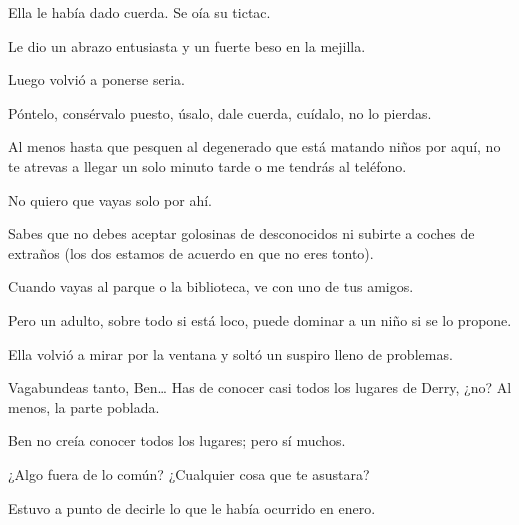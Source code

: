\sk
Ella le había dado cuerda. Se oía su tictac.

\sk
Le dio un abrazo entusiasta y un fuerte beso en la mejilla.

\sk
Luego volvió a ponerse seria.

\sk
Póntelo, consérvalo puesto, úsalo, dale
cuerda, cuídalo, no lo pierdas.

\sk
Al menos hasta que pesquen al degenerado que está
matando niños por aquí, no te atrevas a llegar un
solo minuto tarde o me tendrás al teléfono.

\sk
No quiero que vayas solo por ahí.

\sk
Sabes que no debes aceptar golosinas de
desconocidos ni subirte a coches de extraños (los
dos estamos de acuerdo en que no eres tonto).

\sk
Cuando vayas al parque o la biblioteca,
ve con uno de tus amigos.

\sk
Pero un adulto, sobre
todo si está loco, puede dominar a un niño si se lo
propone. 

\sk
Ella volvió a mirar por la ventana y soltó un
suspiro lleno de problemas.

\sk
Vagabundeas tanto, Ben\ldots{} Has de conocer casi
todos los lugares de Derry, ¿no? Al menos, la parte
poblada.

\sk
Ben no creía conocer todos los lugares; pero sí
muchos. 

\sk
¿Algo
fuera de lo común? ¿Cualquier cosa que te
asustara?

\sk
Estuvo a punto de decirle lo que le había ocurrido
en enero.

